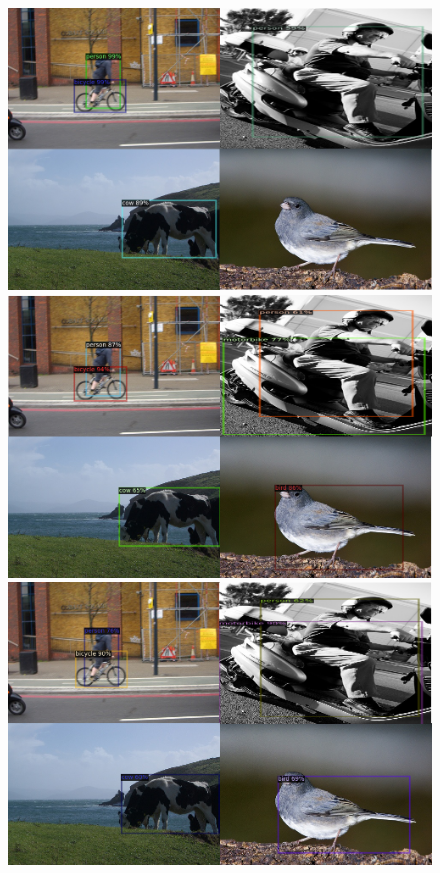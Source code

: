 \documentclass{article}
\begin{document}
\begin{figure}[h]
  \begin{minipage}{0.47\textwidth}
  \includegraphics[width=\textwidth, height=0.17\textheight]{./../../figures/1shotpascal.png}
  \end{minipage}
  \begin{minipage}{0.47\textwidth}
  \includegraphics[width=\textwidth, height=0.17\textheight]{./../../figures/5shotpascal.png}
  \end{minipage}
  \begin{minipage}{0.47\textwidth}
  \includegraphics[width=\textwidth, height=0.17\textheight]{./../../figures/10shotpascal.png}

\end{minipage}
\end{figure}
\end{document}
